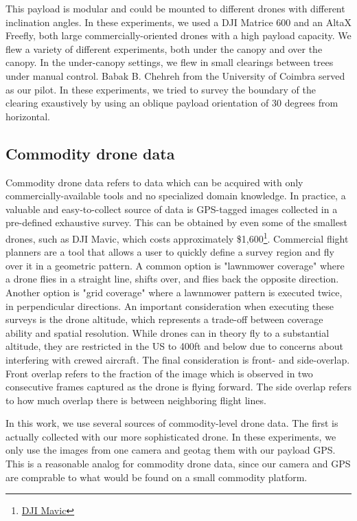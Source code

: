 This payload is modular and could be mounted to different drones with different inclination angles. In these experiments, we used a DJI Matrice 600 and an AltaX Freefly, both large commercially-oriented drones with a high payload capacity. We flew a variety of different experiments, both under the canopy and over the canopy. In the under-canopy settings, we flew in small clearings between trees under manual control. Babak B. Chehreh from the University of Coimbra served as our pilot. In these experiments, we tried to survey the boundary of the clearing exaustively by using an oblique payload orientation of 30 degrees from horizontal.
\subsection{Commodity drone data}
Commodity drone data refers to data which can be acquired with only commercially-available tools and no specialized domain knowledge. In practice, a valuable and easy-to-collect source of data is GPS-tagged images collected in a pre-defined exhaustive survey. This can be obtained by even some of the smallest drones, such as DJI Mavic, which costs approximately \$1,600\footnote{\href{https://store.dji.com/product/dji-mavic-3-classic}{DJI Mavic}}. Commercial flight planners are a tool that allows a user to quickly define a survey region and fly over it in a geometric pattern. A common option is "lawnmower coverage" where a drone flies in a straight line, shifts over, and flies back the opposite direction. Another option is "grid coverage" where a lawnmower pattern is executed twice, in perpendicular directions. An important consideration when executing these surveys is the drone altitude, which represents a trade-off between coverage ability and spatial resolution. While drones can in theory fly to a substantial altitude, they are restricted in the US to 400ft and below due to concerns about interfering with crewed aircraft. The final consideration is front- and side-overlap. Front overlap refers to the fraction of the image which is observed in two consecutive frames captured as the drone is flying forward. The side overlap refers to how much overlap there is between neighboring flight lines.

In this work, we use several sources of commodity-level drone data. The first is actually collected with our more sophisticated drone. In these experiments, we only use the images from one camera and geotag them with our payload GPS. This is a reasonable analog for commodity drone data, since our camera and GPS are comprable to what would be found on a small commodity platform. 

